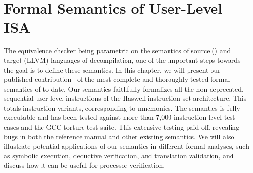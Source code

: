 \chapter{Formal Semantics of \ISA User-Level ISA}\label{sec:results}

The equivalence checker being parametric on the semantics of source (\ISA) and
target (LLVM) languages of decompilation, one of the important steps towards
the goal is to define these semantics. In this chapter, we will present our
published contribution~\cite{DasguptaAdve:PLDI19} of the most complete and
thoroughly tested formal semantics of \ISA to date.  Our semantics faithfully
formalizes all the non-deprecated, sequential user-level instructions of the
\ISA Haswell instruction set architecture.  This totals \currentIS{}
instruction variants, corresponding to \currentIntel{} mnemonics. %
The semantics is fully executable and has been tested against more than 7,000
instruction-level test cases and the GCC torture test suite. This extensive
testing paid off, revealing bugs in both the \ISA reference manual and other
existing semantics. We will also illustrate potential applications of our
  semantics in different formal analyses, such as symbolic execution, deductive
    verification, and translation validation, and discuss how it can be useful
    for processor verification.










%
